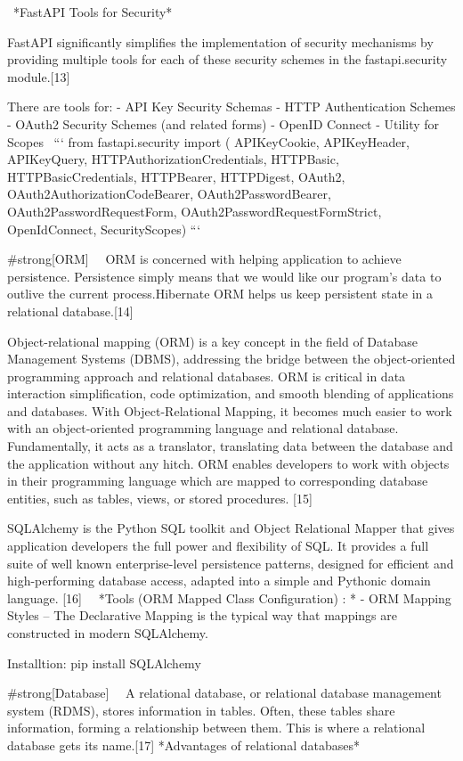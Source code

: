 \
*FastAPI Tools for Security*
\
\

FastAPI significantly simplifies the implementation of security mechanisms by providing multiple tools for each of these security schemes in the fastapi.security module.[13]

There are tools for:
- API Key Security Schemas 
- HTTP Authentication Schemes
- OAuth2 Security Schemes (and related forms)
- OpenID Connect
- Utility for Scopes
\
```
from fastapi.security import (
    APIKeyCookie,
    APIKeyHeader,
    APIKeyQuery,
    HTTPAuthorizationCredentials,
    HTTPBasic,
    HTTPBasicCredentials,
    HTTPBearer,
    HTTPDigest,
    OAuth2,
    OAuth2AuthorizationCodeBearer,
    OAuth2PasswordBearer,
    OAuth2PasswordRequestForm,
    OAuth2PasswordRequestFormStrict,
    OpenIdConnect,
    SecurityScopes)
```
\
\

#strong[ORM]
\
\
ORM is concerned with helping application to achieve persistence. Persistence simply means that we would like our program’s data to outlive the current process.Hibernate ORM helps us keep persistent state in a relational database.[14]

Object-relational mapping (ORM) is a key concept in the field of Database Management Systems (DBMS), addressing the bridge between the object-oriented programming approach and relational databases. ORM is critical in data interaction simplification, code optimization, and smooth blending of applications and databases. With Object-Relational Mapping, it becomes much easier to work with an object-oriented programming language and relational database. Fundamentally, it acts as a translator, translating data between the database and the application without any hitch. ORM enables developers to work with objects in their programming language which are mapped to corresponding database entities, such as tables, views, or stored procedures.
[15]

SQLAlchemy is the Python SQL toolkit and Object Relational Mapper that gives application developers the full power and flexibility of SQL. It provides a full suite of well known enterprise-level persistence patterns, designed for efficient and high-performing database access, adapted into a simple and Pythonic domain language. [16]
\
\
*Tools (ORM Mapped Class Configuration) : *
- ORM Mapping Styles
  -- The Declarative Mapping is the typical way that mappings are constructed in modern SQLAlchemy. 

Installtion: pip install SQLAlchemy
\
\


#strong[Database]
\
\
A relational database, or relational database management system (RDMS), stores information in tables. Often, these tables share information, forming a relationship between them. This is where a relational database gets its name.[17]
*Advantages of relational databases*

